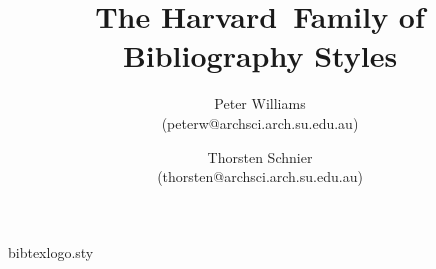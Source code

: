\begin{filecontents}{bibtexlogo.sty}
\def\lowBibTeX{{\reset@font\rmfamily B\kern-.05em%
    \raise.0ex\hbox{\scshape i\kern-.025em b}\kern-.08em%
    T\kern-.1667em\lower.7ex\hbox{E}\kern-.125emX}}
\def\BibTeX{\protect\lowBibTeX}
\end{filecontents}
\documentclass[a4paper]{article}
\usepackage{harvard}
\usepackage{bibtexlogo}

\newcommand{\comname}[1]{{\bf $\backslash$#1}}
\newcommand{\keyword}[1]{{\bf #1}}
\newcommand{\varname}[1]{{\em #1}}
\newcommand{\harvard}{{\sf harvard}}
\newcommand{\Harvard}{{\sf Harvard}}

\title{The \Harvard\ Family of Bibliography Styles}
\author{Peter Williams \\ (peterw@archsci.arch.su.edu.au) \and
Thorsten Schnier \\ (thorsten@archsci.arch.su.edu.au)}




\maketitle
\tableofcontents

\section{Introduction}

This document describes the \harvard\ family of bibliographic styles which
are provided in addition to those described in  and .
This style is primarily intended for use with the \BibTeX\ bibliographic
database management system.
However, provision is also made for hand coding of bibliographies.

\section{Citations}

\subsection{Complete Citations}

